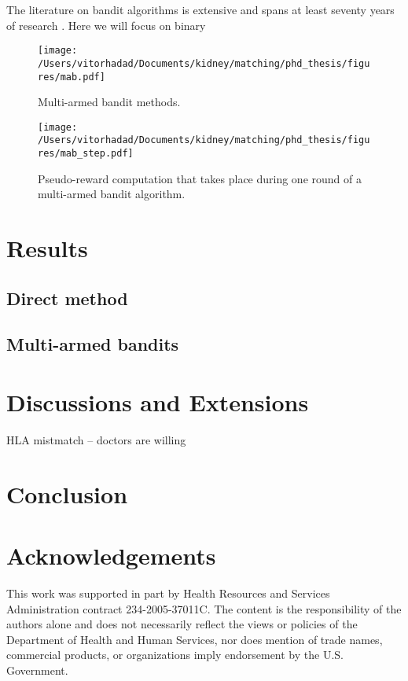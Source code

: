 \documentclass[12pt]{article}
\begin{document}
 The literature on bandit algorithms is extensive and spans at least seventy years of research \citep{lattimore2018bandits}. Here we will focus on binary 


 \begin{figure}
 \centering
 \hspace*{-1cm}
 \texttt{[image: /Users/vitorhadad/Documents/kidney/matching/phd\_thesis/figures/mab.pdf]}
 \caption{Multi-armed bandit methods.}
 \label{fig:mab}
 \end{figure}

 \begin{figure}
 \centering
 \texttt{[image: /Users/vitorhadad/Documents/kidney/matching/phd\_thesis/figures/mab\_step.pdf]}
 \caption{Pseudo-reward computation that takes place during one round of a multi-armed bandit algorithm.}
 \label{fig:mab_step}
 \end{figure}
 
  


\section{Results} \label{sec:results}

\subsection{Direct method}


\subsection{Multi-armed bandits}


\section{Discussions and Extensions} \label{sec:discussion}

HLA mistmatch -- doctors are willing 

\section{Conclusion} \label{sec:conclusion}


\section{Acknowledgements}

This work was supported in part by Health Resources and Services Administration contract 234-2005-37011C. The content is the responsibility of the authors alone and does not necessarily reflect the views or policies of the Department of Health and Human Services, nor does mention of trade names, commercial products, or organizations imply endorsement by the U.S. Government.
\end{document}
